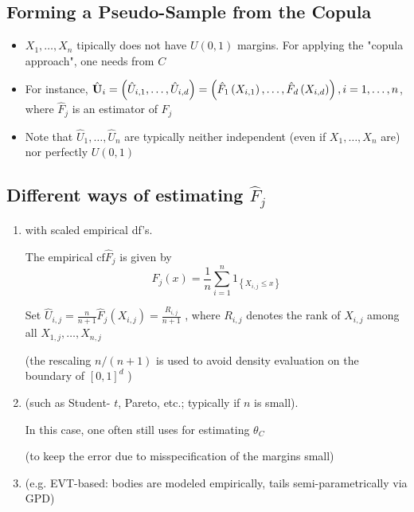 \subsection*{Forming a Pseudo-Sample from the Copula}
\begin{itemize}[leftmargin=*]
    \item $X_{1}, \ldots, X_{n}$ tipically does not have $U(0,1)$ margins. For applying the "copula approach", one needs  from $C$
    \item For instance, $\hat{\operatorname{\boldsymbol{\mathbf{U}}}}_{i}=\left(\hat{U}_{i, 1}, \ldots, \hat{U}_{i, d}\right)=\left(\hat{F}_{1}\left(X_{i, 1}\right), \ldots, \hat{F}_{d}\left(X_{i, d}\right)\right), i=1, \ldots, n$, where $\hat{F}_{j}$ is an estimator of $F_{j}$
    \item Note that $\hat{U}_{1}, \ldots, \hat{U}_{n}$ are typically neither independent (even if $X_{1}, \ldots, X_{n}$ are) nor perfectly $U(0,1)$
\end{itemize}








\subsection*{Different ways of estimating $\hat{F}_{j}$}
\begin{enumerate}[label = (\arabic*), leftmargin=*]
    \item {} with scaled empirical df's.
    
The empirical $\mathrm{cf} \hat{F}_{j}$ is given by
$$
\hat{F}_{j}(x)=\frac{1}{n} \sum_{i=1}^{n} 1_{\left\{X_{i, j} \leq x\right\}}
$$

Set
$
\hat{U}_{i, j}=\frac{n}{n+1} \hat{F}_{j}\left(X_{i, j}\right)=\frac{R_{i, j}}{n+1}
$ , 
where $R_{i, j}$ denotes the rank of $X_{i, j}$ among all $X_{1, j}, \ldots, X_{n, j}$

(the rescaling $n /(n+1)$ is used to avoid density evaluation on the boundary of $[0,1]^{d}$ )
    \item {} (such as Student- $t$, Pareto, etc.; typically if $n$ is small).
    
In this case, one often still uses  for estimating $\theta_{C}$

(to keep the error due to misspecification of the margins small)
    \item {} (e.g. EVT-based: bodies are modeled empirically, tails semi-parametrically via GPD)
\end{enumerate}








